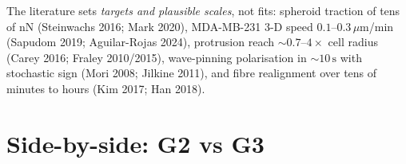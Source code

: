 \documentclass[11pt]{article}
\newcommand{\umt}{\mu\text{m}}            %
\newcommand{\um}{\,\umt}
\begin{document}
\noindent The literature sets \emph{targets and plausible scales}, not fits: spheroid traction of
tens of nN (Steinwachs 2016; Mark 2020), MDA-MB-231 3-D speed $0.1$--$0.3\um$/min (Sapudom 2019;
Aguilar-Rojas 2024), protrusion reach $\sim\!0.7$--$4\times$ cell radius (Carey 2016; Fraley
2010/2015), wave-pinning polarisation in $\sim\!10\,\text{s}$ with stochastic sign (Mori 2008;
Jilkine 2011), and fibre realignment over tens of minutes to hours (Kim 2017; Han 2018).

\section{Side-by-side: G2 vs G3}
\label{sec:compare}

\renewcommand{\arraystretch}{1.25}
\end{document}
